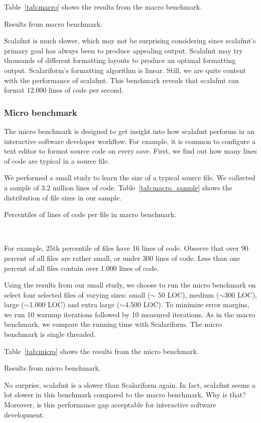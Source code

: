 Table~\ref{tab:macro} shows the results from the macro benchmark.
\begin{table}
  \centering
  \caption{Results from macro benchmark.}\label{tab:macro}
  
\end{table}
Scalafmt is much slower, which may not be surprising considering since scalafmt's primary goal has always been to produce appealing output.
Scalafmt may try thousands of different formatting layouts to produce an optimal formatting output.
Scalariform's formatting algorithm is linear.
Still, we are quite content with the performance of scalafmt.
This benchmark reveals that scalafmt can format 12.000 lines of code per second.


\subsubsection{Micro benchmark}
The micro benchmark is designed to get insight into how scalafmt performs in an interactive software developer workflow.
For example, it is common to configure a text editor to format source code on every save.
First, we find out how many lines of code are typical in a source file.

We performed a small study to learn the size of a typical source file.
We collected a sample of 3.2 million lines of code.
Table~\ref{tab:macro_sample} shows the distribution of file sizes in our sample.
\begin{table}
  \centering
  \caption{Percentiles of lines of code per file in macro benchmark.}~\label{tab:macro_sample}
  
\end{table}
For example, 25th percentile of files have 16 lines of code.
Observe that over 90 percent of all files are rather small, or under 300 lines of code.
Less than one percent of all files contain over 1.000 lines of code.

Using the results from our small study, we choose to run the micro benchmark on select four selected files of varying sizes: small ($\sim$ 50 LOC), medium ($\sim$300 LOC), large ($\sim$1.000 LOC) and extra large ($\sim$4.500 LOC).
To minimize error margins, we run 10 warmup iterations followed by 10 measured iterations.
As in the macro benchmark, we compare the running time with Scalariform.
The micro benchmark is single threaded.

Table~\ref{tab:micro} shows the results from the micro benchmark.
\begin{table}
  \centering
  \caption{Results from micro benchmark.}\label{tab:micro}
  
\end{table}
No surprise, scalafmt is a slower than Scalariform again.
In fact, scalafmt seems a lot slower in this benchmark compared to the macro benchmark.
Why is that?
Moreover, is this performance gap acceptable for interactive software development.

